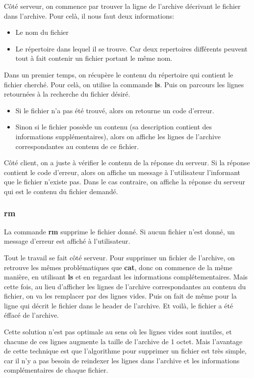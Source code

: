 \documentclass[titlepage]{article}
\begin{document}
	Côté serveur, on commence par trouver la ligne de l'archive décrivant le fichier dans l'archive. Pour celà, il nous faut deux informations:
	\begin{itemize}  
		\item Le nom du fichier   
		\item Le répertoire dans lequel il se trouve. Car deux repertoires différents peuvent tout à fait contenir un fichier portant le même nom.   
	\end{itemize}

	Dans un premier temps, on récupère le contenu du répertoire qui contient le fichier cherché. Pour celà, on utilise la commande \textbf{ls}. Puis on parcours les lignes retournées à la recherche du fichier désiré.

	\begin{itemize}
		\item Si le fichier n'a pas été trouvé, alors on retourne un code d'erreur.
		\item Sinon si le fichier possède un contenu (sa description contient des informations supplémentaires), alors on affiche les lignes de l'archive correspondantes au contenu de ce fichier.
	\end{itemize}

	Côté client, on a juste à vérifier le contenu de la réponse du serveur. Si la réponse contient le code d'erreur, alors on affiche un message à l'utilisateur l'informant que le fichier n'existe pas. Dans le cas contraire, on affiche la réponse du serveur qui est le contenu du fichier demandé.

	\subsubsection{rm}

	La commande \textbf{rm} supprime le fichier donné. Si aucun fichier n'est donné, un message d'erreur est affiché à l'utilisateur.

	Tout le travail se fait côté serveur. Pour supprimer un fichier de l'archive, on retrouve les mêmes problématiques que \textbf{cat}, donc on commence de la même manière, en utilisant \textbf{ls} et en regardant les informations complétementaires. Mais cette fois, au lieu d'afficher les lignes de l'archive correspondantes au contenu du fichier, on va les remplacer par des lignes vides. Puis on fait de même pour la ligne qui décrit le fichier dans le header de l'archive. Et voilà, le fichier a été éffacé de l'archive.

	Cette solution n'est pas optimale au sens où les lignes vides sont inutiles, et chacune de ces lignes augmente la taille de l'archive de 1 octet. Mais l'avantage de cette technique est que l'algorithme pour supprimer un fichier est très simple, car il n'y a pas besoin de reindexer les lignes dans l'archive et les informations complémentaires de chaque fichier.
\end{document}
